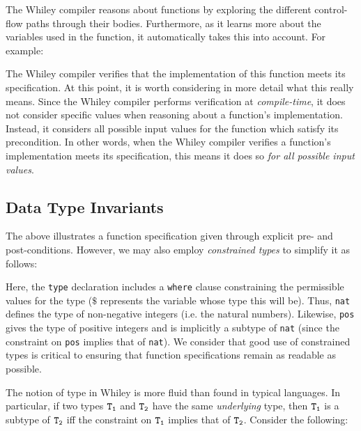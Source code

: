 The Whiley compiler reasons about functions by exploring the different
control-flow paths through their bodies.  Furthermore, as it learns
more about the variables used in the function, it automatically takes
this into account.  For example:



The Whiley compiler verifies that the implementation of this function
meets its specification.  At this point, it is worth considering in
more detail what this really means.  Since the Whiley compiler
performs verification at {\em compile-time}, it does not consider
specific values when reasoning about a function's implementation.
Instead, it considers all possible input values for the function which
satisfy its precondition.  In other words, when the Whiley compiler
verifies a function's implementation meets its specification, this
means it does so {\em for all possible input values}.  

\subsection{Data Type Invariants}

The above illustrates a function specification given through explicit pre- and
post-conditions.  However, we may also employ {\em constrained types}
to simplify it as follows:



Here, the \lstinline{type} declaration includes a \lstinline{where}
clause constraining the permissible values for the type ($\$$
represents the variable whose type this will be).  Thus,
\lstinline{nat} defines the type of non-negative integers (i.e. the
natural numbers).  Likewise, \lstinline{pos} gives the type of
positive integers and is implicitly a subtype of \lstinline{nat}
(since the constraint on \lstinline{pos} implies that of
\lstinline{nat}).  We consider that good use of constrained types is
critical to ensuring that function specifications remain as readable
as possible.

The notion of type in Whiley is more fluid than found in typical
languages.  In particular, if two types ${\tt T_1}$ and ${\tt T_2}$
have the same {\em underlying} type, then ${\tt T_1}$ is a subtype of
${\tt T_2}$ iff the constraint on ${\tt T_1}$ implies that of ${\tt
  T_2}$.  Consider the following:



